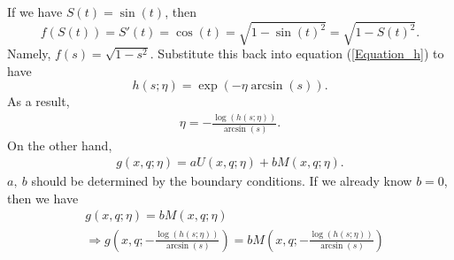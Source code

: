 \documentclass[paper=a4, fontsize=15pt]{scrartcl} %
\numberwithin{equation}{section} %
\numberwithin{figure}{section} %
\numberwithin{table}{section} %
\begin{document}
If we have $S(t) = \sin(t)$, then 
\begin{equation*}
	f(S(t)) = S'(t) = \cos(t) =  \sqrt{1-\sin(t)^2}   = \sqrt{1-S(t)^2}.
\end{equation*}
Namely, $f(s) = \sqrt{1-s^2}$. Substitute this back into equation (\ref{Equation_h}) to have
\begin{equation*}
  h(s;\eta) = \exp(-\eta \arcsin(s)).
\end{equation*}
As a result,
\begin{equation*}
\begin{split}
  \eta = -\frac{\log(h(s;\eta))}{\arcsin(s)}.
\end{split}
\end{equation*}
On the other hand,
\begin{equation*}
\begin{split}
  g(x,q;\eta) = aU(x,q;\eta) + bM(x,q;\eta).
\end{split}
\end{equation*}
$a,~b$ should be determined by the boundary conditions. If we already know $b=0$, then we have 
\begin{equation*}
\begin{split}
  &g(x,q;\eta) = bM(x,q;\eta) \\
  &\Rightarrow g(x,q;-\frac{\log(h(s;\eta))}{\arcsin(s)}) = bM(x,q;-\frac{\log(h(s;\eta))}{\arcsin(s)})
\end{split}
\end{equation*}
\end{document}
